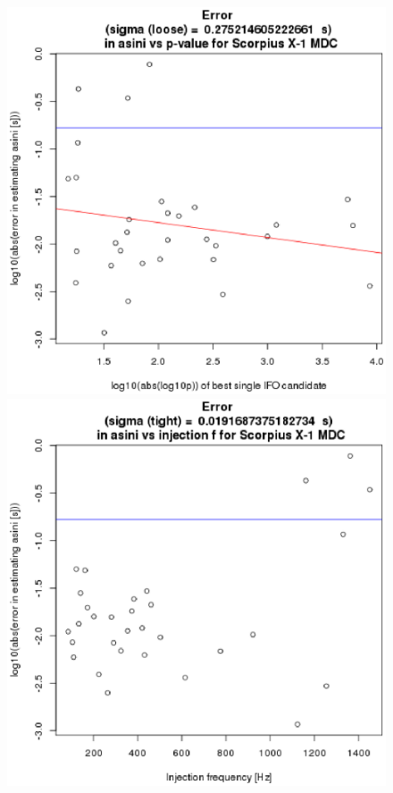 \begin{figure}
\begin{center}
\includegraphics[width=0.3\paperwidth,height=0.2\paperheight]{ErrorAsini.eps}
\includegraphics[width=0.3\paperwidth,height=0.2\paperheight]{ErrorAsinivsF.eps}

\end{center}
\end{figure}

